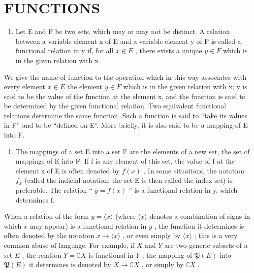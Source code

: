 \section{FUNCTIONS}

\begin{enumerate}
\def\labelenumi{\arabic{enumi}.}
\tightlist
\item
  Let E and F be two sets, which may or may not be distinct. A relation between a variable element x of E and a variable element y of F is called a functional relation in y if, for all \(x \in E\) , there exists a unique \(y \in F\) which is in the given relation with x.
\end{enumerate}

We give the name of function to the operation which in this way associates with every element \(x \in E\) the element \(y \in F\) which is in the given relation with x; y is said to be the value of the function at the element x, and the function is said to be determined by the given functional relation. Two equivalent functional relations determine the same function. Such a function is said to ``take its values in F'' and to be ``defined on E''. More briefly, it is also said to be a mapping of E into F.

\begin{enumerate}
\def\labelenumi{\arabic{enumi}.}
\setcounter{enumi}{1}
\tightlist
\item
  The mappings of a set E into a set F are the elements of a new set, the set of mappings of E into F. If f is any element of this set, the value of f at the element x of E is often denoted by \(f(x)\) . In some situations, the notation \(f_{x}\) (called the indicial notation; the set E is then called the index set) is preferable. The relation `` \(y = f(x)\) '' is a functional relation in y, which determines f.
\end{enumerate}

When a relation of the form \(y = \langle x \rangle\) (where \(\langle x \rangle\) denotes a combination of signs in which \(x\) may appear) is a functional relation in \(y\) , the function it determines is often denoted by the notation \(x \to \langle x \rangle\) , or even simply by \(\langle x \rangle\) ; this is a very common abuse of language. For example, if \(X\) and \(Y\) are two generic subsets of a set \(E\) , the relation \(Y = \complement X\) is functional in \(Y\) ; the mapping of \(\mathfrak{P}(E)\) into \(\mathfrak{P}(E)\) it determines is denoted by \(X \to \complement X\) , or simply by \(\complement X\) .

